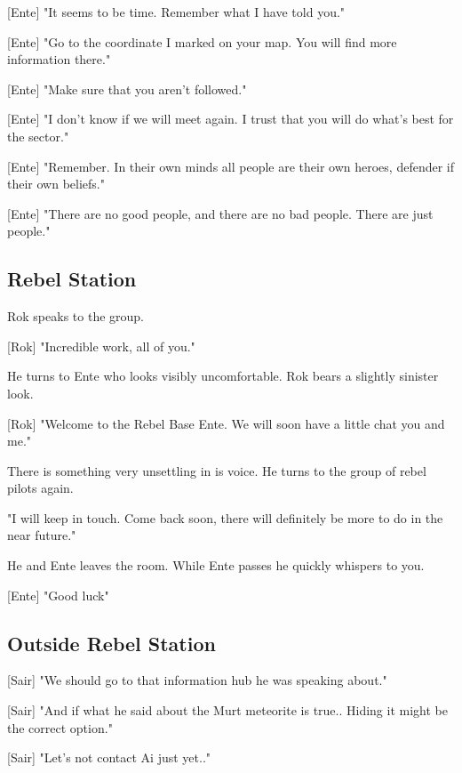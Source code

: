 \documentclass[a4paper,12pt]{article}
\begin{document}
[Ente] "It seems to be time. Remember what I have told you." 

[Ente] "Go to the coordinate I marked on your map. You will find more information there."

[Ente] "Make sure that you aren't followed."

[Ente] "I don't know if we will meet again. I trust that you will do what's best for the sector."

[Ente] "Remember. In their own minds all people are their own heroes, defender if their own beliefs."

[Ente] "There are no good people, and there are no bad people. There are just people."

\subsection{Rebel Station}

Rok speaks to the group. 

[Rok] "Incredible work, all of you."

He turns to Ente who looks visibly uncomfortable. Rok bears a slightly sinister look.

[Rok] "Welcome to the Rebel Base Ente. We will soon have a little chat you and me."

There is something very unsettling in is voice. He turns to the group of rebel pilots again.

"I will keep in touch. Come back soon, there will definitely be more to do in the near future."

He and Ente leaves the room. While Ente passes he quickly whispers to you. 

[Ente] "Good luck"

\subsection{Outside Rebel Station}

[Sair] "We should go to that information hub he was speaking about."

[Sair] "And if what he said about the Murt meteorite is true.. Hiding it might be the correct option."

[Sair] "Let's not contact Ai just yet.."
\end{document}
